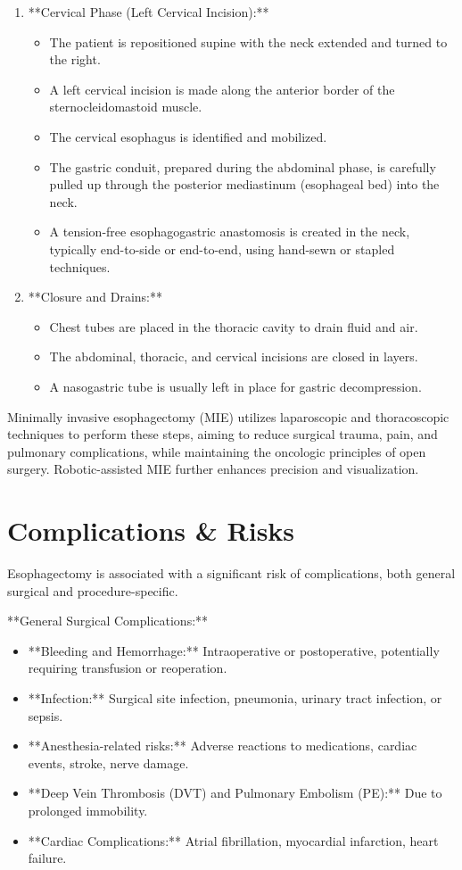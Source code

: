 \begin{enumerate}
  \item **Cervical Phase (Left Cervical Incision):**
    \begin{itemize}
      \item The patient is repositioned supine with the neck extended and turned to the right.
      \item A left cervical incision is made along the anterior border of the sternocleidomastoid muscle.
      \item The cervical esophagus is identified and mobilized.
      \item The gastric conduit, prepared during the abdominal phase, is carefully pulled up through the posterior mediastinum (esophageal bed) into the neck.
      \item A tension-free esophagogastric anastomosis is created in the neck, typically end-to-side or end-to-end, using hand-sewn or stapled techniques.
    \end{itemize}

  \item **Closure and Drains:**
    \begin{itemize}
      \item Chest tubes are placed in the thoracic cavity to drain fluid and air.
      \item The abdominal, thoracic, and cervical incisions are closed in layers.
      \item A nasogastric tube is usually left in place for gastric decompression.
    \end{itemize}
\end{enumerate}

Minimally invasive esophagectomy (MIE) utilizes laparoscopic and thoracoscopic techniques to perform these steps, aiming to reduce surgical trauma, pain, and pulmonary complications, while maintaining the oncologic principles of open surgery. Robotic-assisted MIE further enhances precision and visualization.

\section*{Complications \& Risks}
Esophagectomy is associated with a significant risk of complications, both general surgical and procedure-specific.

**General Surgical Complications:**
\begin{itemize}
  \item **Bleeding and Hemorrhage:** Intraoperative or postoperative, potentially requiring transfusion or reoperation.
  \item **Infection:** Surgical site infection, pneumonia, urinary tract infection, or sepsis.
  \item **Anesthesia-related risks:** Adverse reactions to medications, cardiac events, stroke, nerve damage.
  \item **Deep Vein Thrombosis (DVT) and Pulmonary Embolism (PE):** Due to prolonged immobility.
  \item **Cardiac Complications:** Atrial fibrillation, myocardial infarction, heart failure.
\end{itemize}

